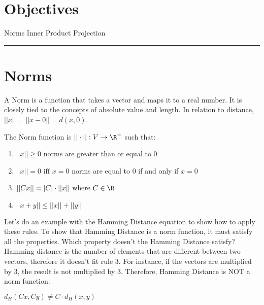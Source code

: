 
\section*{Objectives}
\begin{outline}
    \1 Norms
    \1 Inner Product
    \1 Projection
\end{outline}

\rule[0.0051in]{\textwidth}{0.00025in}
\section{Norms}

A Norm is a function that takes a vector and maps it to a real number. It is closely tied to the concepts of absolute value and length. In relation to distance, $||x|| = ||x - 0|| = d(x,0)$. 

The Norm function is $||\cdot|| : V \rightarrow \R^{+}$ such that:

\begin{enumerate}
	\item $||x|| \ge 0$    norms are greater than or equal to 0
	\item $||x|| = 0 \text{ iff } x = 0$    norms are equal to 0 if and only if $x = 0$
	\item $||Cx|| = |C| \cdot ||x|| \text{ where } C \in \R$
	\item $||x+y|| \leq ||x|| + ||y||$
\end{enumerate}


Let's do an example with the Hamming Distance equation to show how to apply these rules. To show that Hamming Distance is a norm function, it must satisfy all the properties. Which property doesn't the Hamming Distance satisfy? Hamming distance is the number of elements that are different between two vectors, therefore it doesn't fit rule 3. For instance, if the vectors are multiplied by 3, the result is not multiplied by 3. Therefore, Hamming Distance is NOT a norm function:

\centering
$d_{H}(Cx,Cy) \ne C \cdot d_{H}(x,y)$

\raggedright


